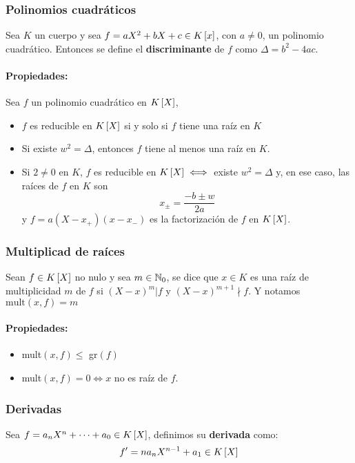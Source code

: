 \subsubsection{Polinomios cuadráticos}
Sea $K$ un cuerpo y sea $f = aX^2 + bX + c\in K\left[x\right]$, con $a\neq 0$, un polinomio cuadrático. Entonces se define el \textbf{discriminante} de $f$ como $\Delta = b
^2 - 4ac$.

\paragraph{Propiedades:} Sea $f$ un polinomio cuadrático en $K\left[X\right]$,
\begin{itemize}
\item $f$ es reducible en $K\left[X\right]$ si y solo si $f$ tiene una raíz en $K$
\item Si existe $w^2 = \Delta$, entonces $f$ tiene al menos una raíz en $K$.
\item Si $2\neq0$ en $K$, $f$ es reducible en $K\left[X\right]\iff$ existe $w^2 = \Delta$ y, en ese caso, las raíces de $f$ en $K$ son
\begin{equation*}
    x_{\pm} = \frac{-b \pm w}{2a}
\end{equation*}
y $f = a(X-x_+)(x-x_-)$ es la factorización de $f$ en $K\left[X\right]$.
\end{itemize}

\subsubsection{Multiplicad de raíces}
Sean $f\in K\left[X\right]$ no nulo y sea $m\in\mathbb{N}_0$, se dice que $x\in K$ es una raíz de multiplicidad $m$ de $f$ si $(X-x)^m|f$ y $(X-x)^{m+1}\nmid f$. Y notamos $\text{mult}(x,f) = m$

\paragraph{Propiedades: }
\begin{itemize}
\item mult$(x,f)\leq$ gr$(f)$
\item mult$(x,f) = 0\iff x$ no es raíz de $f$.
\end{itemize}

\subsubsection{Derivadas}
Sea $f = a_nX^n + \dots + a_0 \in K\left[X\right]$, definimos su \textbf{derivada} como:
\begin{equation*}
    f' = na_nX^{n-1} + a_1\in K\left[X\right]
\end{equation*}

